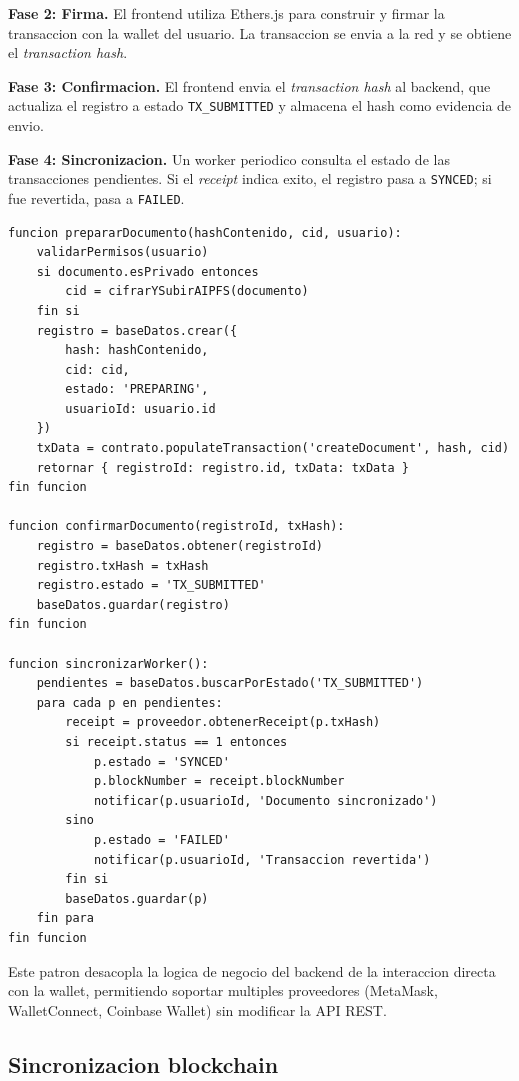 \documentclass[11pt, a4paper]{article}
\begin{document}
\textbf{Fase 2: Firma.} El frontend utiliza Ethers.js para construir y firmar la transaccion con la wallet del usuario. La transaccion se envia a la red y se obtiene el \textit{transaction hash}.

\textbf{Fase 3: Confirmacion.} El frontend envia el \textit{transaction hash} al backend, que actualiza el registro a estado \texttt{TX\_SUBMITTED} y almacena el hash como evidencia de envio.

\textbf{Fase 4: Sincronizacion.} Un worker periodico consulta el estado de las transacciones pendientes. Si el \textit{receipt} indica exito, el registro pasa a \texttt{SYNCED}; si fue revertida, pasa a \texttt{FAILED}.

\begin{lstlisting}[caption={Pseudocodigo del flujo prepare/confirm}, label={lst:prepare-confirm}]
funcion prepararDocumento(hashContenido, cid, usuario):
    validarPermisos(usuario)
    si documento.esPrivado entonces
        cid = cifrarYSubirAIPFS(documento)
    fin si
    registro = baseDatos.crear({
        hash: hashContenido,
        cid: cid,
        estado: 'PREPARING',
        usuarioId: usuario.id
    })
    txData = contrato.populateTransaction('createDocument', hash, cid)
    retornar { registroId: registro.id, txData: txData }
fin funcion

funcion confirmarDocumento(registroId, txHash):
    registro = baseDatos.obtener(registroId)
    registro.txHash = txHash
    registro.estado = 'TX_SUBMITTED'
    baseDatos.guardar(registro)
fin funcion

funcion sincronizarWorker():
    pendientes = baseDatos.buscarPorEstado('TX_SUBMITTED')
    para cada p en pendientes:
        receipt = proveedor.obtenerReceipt(p.txHash)
        si receipt.status == 1 entonces
            p.estado = 'SYNCED'
            p.blockNumber = receipt.blockNumber
            notificar(p.usuarioId, 'Documento sincronizado')
        sino
            p.estado = 'FAILED'
            notificar(p.usuarioId, 'Transaccion revertida')
        fin si
        baseDatos.guardar(p)
    fin para
fin funcion
\end{lstlisting}

Este patron desacopla la logica de negocio del backend de la interaccion directa con la wallet, permitiendo soportar multiples proveedores (MetaMask, WalletConnect, Coinbase Wallet) sin modificar la API REST.

\subsection{Sincronizacion blockchain}
\end{document}

